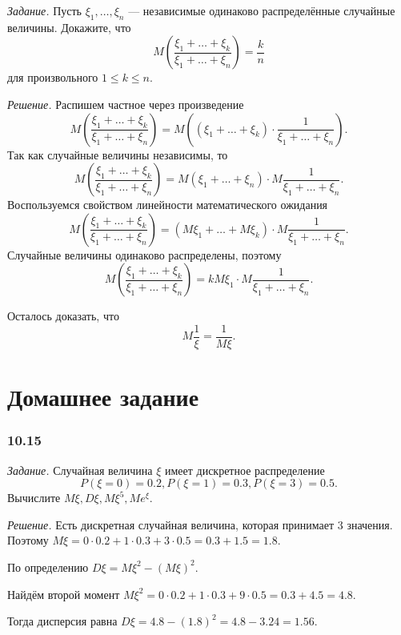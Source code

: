 \textit{Задание.} Пусть $ \xi_1, \dotsc, \xi_n$ --- независимые одинаково распределённые случайные величины.
Докажите, что
$$M \left( \frac{ \xi_1 + \dotsc + \xi_k}{ \xi_1 + \dotsc + \xi_n} \right) =
\frac{k}{n}$$
для произвольного $1 \leq k \leq n$.

\textit{Решение.} Распишем частное через произведение
$$M \left( \frac{ \xi_1 + \dotsc + \xi_k}{ \xi_1 + \dotsc + \xi_n} \right) =
M \left( \left( \xi_1 + \dotsc + \xi_k \right) \cdot \frac{1}{ \xi_1 + \dotsc + \xi_n} \right).$$
Так как случайные величины независимы, то
$$M \left( \frac{ \xi_1 + \dotsc + \xi_k}{ \xi_1 + \dotsc + \xi_n} \right) =
M \left( \xi_1 + \dotsc + \xi_n \right) \cdot M \frac{1}{ \xi_1 + \dotsc + \xi_n}.$$
Воспользуемся свойством линейности математического ожидания
$$M \left( \frac{ \xi_1 + \dotsc + \xi_k}{ \xi_1 + \dotsc + \xi_n} \right) =
\left( M \xi_1 + \dotsc + M \xi_k \right) \cdot M \frac{1}{ \xi_1 + \dotsc + \xi_n}.$$
Случайные величины одинаково распределены, поэтому
$$M \left( \frac{ \xi_1 + \dotsc + \xi_k}{ \xi_1 + \dotsc + \xi_n} \right) =
kM \xi_1 \cdot M \frac{1}{ \xi_1 + \dotsc + \xi_n}.$$

Осталось доказать, что
$$M \frac{1}{ \xi } =
\frac{1}{M \xi }.$$

\section*{Домашнее задание}

\subsubsection*{10.15}

\textit{Задание.} Случайная величина $ \xi $ имеет дискретное распределение
$$P \left( \xi = 0 \right) = 0.2,
P \left( \xi = 1 \right) = 0.3,
P \left( \xi = 3 \right) = 0.5.$$
Вычислите $M \xi, D \xi, M \xi^5, Me^{ \xi }$.

\textit{Решение.} Есть дискретная случайная величина, которая принимает 3 значения.
Поэтому $M \xi = 0 \cdot 0.2 + 1 \cdot 0.3 + 3 \cdot 0.5 = 0.3 + 1.5 = 1.8$.

По определению $D \xi = M \xi^2 - \left( M \xi \right)^2$.

Найдём второй момент $M \xi^2 = 0 \cdot 0.2 + 1 \cdot 0.3 + 9 \cdot 0.5 = 0.3 + 4.5 = 4.8$.

Тогда дисперсия равна $D \xi = 4.8 - \left( 1.8 \right)^2 = 4.8 - 3.24 = 1.56$.

